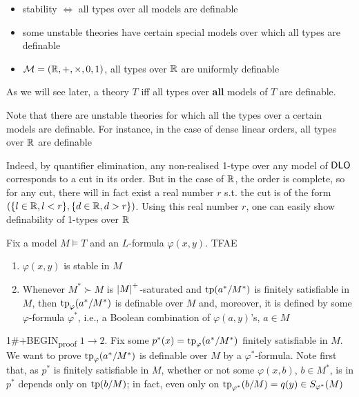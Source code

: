 \documentclass[11pt]{article}
\begin{document}
\begin{examplle}[]
\begin{itemize}
\item stability \(\Leftrightarrow\) all types over all models are definable
\item some unstable theories have certain special models over which all types are definable
\item \(\mathcal{M}=(\mathbb{R},+,\times,0,1)\), all types over \(\mathbb{R}\) are uniformly definable
\end{itemize}
\end{examplle}

As we will see later, a theory \(T\) iff all types over \textbf{all} models of \(T\) are definable.

Note that there are unstable theories for which all the types over a certain models are
definable. For instance, in the case of dense linear orders, all types over \(\mathbb{R}\) are definable

Indeed, by quantifier elimination, any non-realised 1-type over any model of \(\operatorname{\textsf{DLO}}\)
corresponds to a cut in its order. But in the case of \(\mathbb{R}\), the order is complete, so for any
cut, there will in fact exist a real number \(r\) s.t. the cut is of the
form \((\{l\in\mathbb{R},l<r\},\{d\in\mathbb{R},d>r\})\). Using this real number \(r\), one can easily show definability
of 1-types over \(\mathbb{R}\)

\begin{proposition}[]
Fix a model \(M\vDash T\) and an \(L\)-formula \(\varphi(x,y)\). TFAE
\begin{enumerate}
\item \(\varphi(x,y)\) is stable in \(M\)
\item Whenever \(M^*\succ M\) is \(\abs{M}^+\)-saturated and \(\operatorname{tp}(a^*/M^*)\) is finitely satisfiable
in \(M\), then \(\operatorname{tp}_\varphi(a^*/M^*)\) is definable over \(M\) and, moreover, it is defined by
some \(\varphi\)-formula \(\varphi^*\), i.e., a Boolean combination of \(\varphi(a,y)\)'s, \(a\in M\)
\end{enumerate}
\end{proposition}

1\#+BEGIN\textsubscript{proof}
\(1\to 2\). Fix some \(p^*(x)=\operatorname{tp}_\varphi(a^*/M^*)\) finitely satisfiable in \(M\). We want to
prove \(\operatorname{tp}_\varphi(a^*/M^*)\) is definable over \(M\) by a \(\varphi^*\)-formula. Note first that,
as \(p^*\) is finitely satisfiable in \(M\), whether or not some \(\varphi(x,b)\), \(b\in M^*\), is
in \(p^*\) depends only on \(\operatorname{tp}(b/M)\); in fact, even only
on \(\operatorname{tp}_{\varphi^*}(b/M)=q(y)\in S_{\varphi^*}(M)\)
\end{document}

